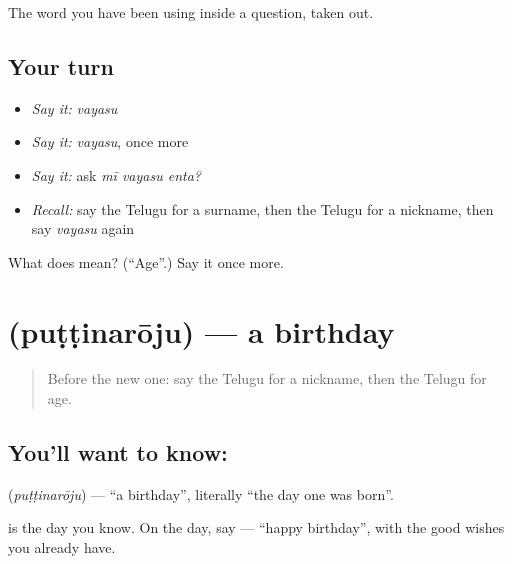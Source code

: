 \begin{grammarlens}[title={What you've built}]
The word you have been using inside a question, taken out.
\end{grammarlens}

\subsection*{Your turn}
\begin{itemize}
\raggedright
  \item \emph{Say it:} \emph{vayasu}
  \item \emph{Say it:} \emph{vayasu}, once more
  \item \emph{Say it:} ask \emph{mī vayasu enta?}
  \item \emph{Recall:} say the Telugu for a surname, then the Telugu for a nickname, then say \emph{vayasu} again
\end{itemize}

\begin{tcolorbox}[breakable,colback=teal!4,colframe=teal!35!black,title={Before you move on}]
What does  mean? (\textquotedblleft{}Age\textquotedblright{}.) Say it once more.
\end{tcolorbox}
\section[\texorpdfstring{\te{పుట్టినరోజు} (puṭṭinarōju)}{పుట్టినరోజు (puṭṭinarōju)}]{ (puṭṭinarōju) — a birthday}

\label{lesson:TE-C96-birthday}



\begin{quote}
Before the new one: say the Telugu for a nickname, then the Telugu for age.
\end{quote}

\subsection*{You'll want to know: }
\textbf{} (\emph{puṭṭinarōju}) — \textquotedblleft{}a birthday\textquotedblright{}, literally \textquotedblleft{}the day one was born\textquotedblright{}.

\textbf{} is the day you know. On the day, say \textbf{ } — \textquotedblleft{}happy birthday\textquotedblright{}, with the good wishes you already have.

